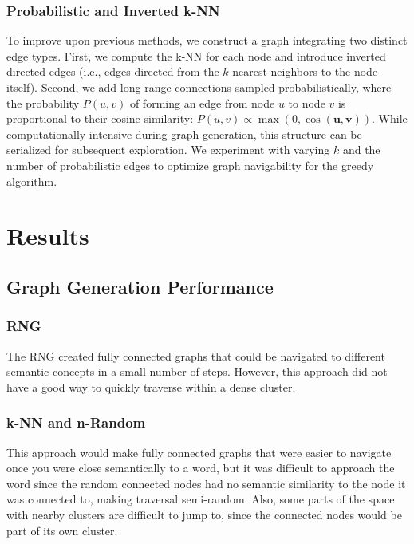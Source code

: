 \documentclass{article}
\begin{document}
\subsubsection{Probabilistic and Inverted \ac{k-NN}}
To improve upon previous methods, we construct a graph integrating two distinct edge types. First, we compute the \ac{k-NN} for each node and introduce inverted directed edges (i.e., edges directed from the $k$-nearest neighbors to the node itself). Second, we add long-range connections sampled probabilistically, where the probability $P(u, v)$ of forming an edge from node $u$ to node $v$ is proportional to their cosine similarity: $P(u, v) \propto \max(0, \cos(\mathbf{u}, \mathbf{v}))$. While computationally intensive during graph generation, this structure can be serialized for subsequent exploration. We experiment with varying $k$ and the number of probabilistic edges to optimize graph navigability for the greedy algorithm.

\section{Results}

\subsection{Graph Generation Performance}

\subsubsection{\ac{RNG}}
The \ac{RNG} created fully connected graphs that could be navigated to different semantic concepts in a small number of steps. However, this approach did not have a good way to quickly traverse within a dense cluster.

\subsubsection{\ac{k-NN} and n-Random}
This approach would make fully connected graphs that were easier to navigate once you were close semantically to a word, but it was difficult to approach the word since the random connected nodes had no semantic similarity to the node it was connected to, making traversal semi-random. Also, some parts of the space with nearby clusters are difficult to jump to, since the connected nodes would be part of its own cluster.



\end{document}
